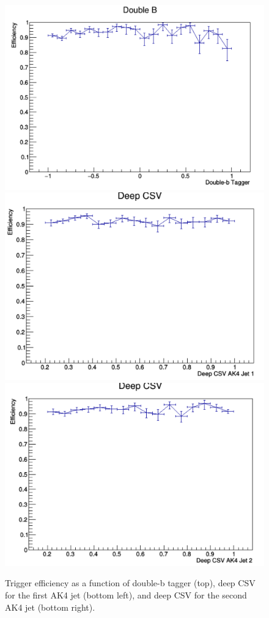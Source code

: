 \begin{figure}[thb!]
\begin{center}
\includegraphics[scale=0.35]{Figures/BTagEffDoubleb.pdf}\\
\includegraphics[scale=0.35]{Figures/BTagEffDCSV1.pdf}
\includegraphics[scale=0.35]{Figures/BTagEffDCSV2.pdf}
\end{center}
\caption{Trigger efficiency as a function of double-b tagger (top), deep CSV for the first AK4 jet (bottom left), and deep CSV for the second AK4 jet (bottom right).}
\label{fig:btagEff}
\end{figure}

